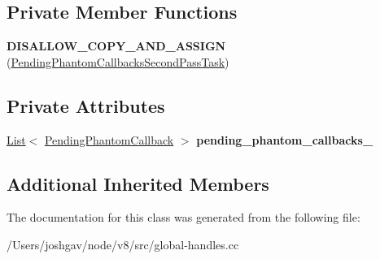 \subsection*{Private Member Functions}
\begin{DoxyCompactItemize}
\item 
{\bfseries D\+I\+S\+A\+L\+L\+O\+W\+\_\+\+C\+O\+P\+Y\+\_\+\+A\+N\+D\+\_\+\+A\+S\+S\+I\+GN} (\hyperlink{classv8_1_1internal_1_1_global_handles_1_1_pending_phantom_callbacks_second_pass_task}{Pending\+Phantom\+Callbacks\+Second\+Pass\+Task})\hypertarget{classv8_1_1internal_1_1_global_handles_1_1_pending_phantom_callbacks_second_pass_task_a63ae82874d41fbdd257d83032226d68e}{}\label{classv8_1_1internal_1_1_global_handles_1_1_pending_phantom_callbacks_second_pass_task_a63ae82874d41fbdd257d83032226d68e}

\end{DoxyCompactItemize}
\subsection*{Private Attributes}
\begin{DoxyCompactItemize}
\item 
\hyperlink{classv8_1_1internal_1_1_list}{List}$<$ \hyperlink{classv8_1_1internal_1_1_global_handles_1_1_pending_phantom_callback}{Pending\+Phantom\+Callback} $>$ {\bfseries pending\+\_\+phantom\+\_\+callbacks\+\_\+}\hypertarget{classv8_1_1internal_1_1_global_handles_1_1_pending_phantom_callbacks_second_pass_task_abdad02cb37afd43dbcd659d4e377139c}{}\label{classv8_1_1internal_1_1_global_handles_1_1_pending_phantom_callbacks_second_pass_task_abdad02cb37afd43dbcd659d4e377139c}

\end{DoxyCompactItemize}
\subsection*{Additional Inherited Members}


The documentation for this class was generated from the following file\+:\begin{DoxyCompactItemize}
\item 
/\+Users/joshgav/node/v8/src/global-\/handles.\+cc\end{DoxyCompactItemize}
